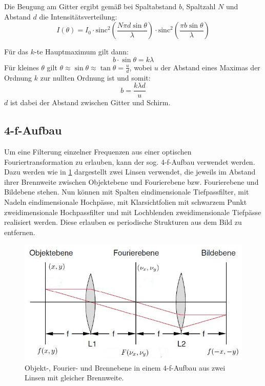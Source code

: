 \documentclass[
	a4paper,
	12pt,
	pagesize,
	ngerman
]{scrartcl}
\begin{document}
	Die Beugung am Gitter ergibt gemäß \cite{Anleitung} bei Spaltabstand $b$, Spaltzahl $N$ und Abstand $d$ die Intensitätsverteilung:
	\begin{equation}
		I(\theta) = I_0 \cdot \text{sinc}^2\left(\frac{N \pi d \sin \theta}{\lambda} \right) \cdot \text{sinc}^2\left(\frac{\pi b \sin \theta}{\lambda} \right)
	\end{equation}


	Für das $k$-te Hauptmaximum gilt dann:
	\begin{equation}
		b \cdot \sin{\theta} = k \lambda
	\end{equation}
	Für kleines $\theta$ gilt $\theta \approx \sin{\theta} \approx \tan{\theta}=\frac{u}{d}$, wobei $u$ der Abstand eines Maximas der Ordnung $k$ zur nullten Ordnung ist und somit:
	\begin{equation}
		\label{eq_beug}
		b = \frac{k\lambda d}{u}
	\end{equation}
	$d$ ist dabei der Abstand zwischen Gitter und Schirm.

	\subsection{4-f-Aufbau}
	Um eine Filterung einzelner Frequenzen aus einer optischen Fouriertransformation zu erlauben, kann der sog. 4-f-Aufbau verwendet werden.
	Dazu werden wie in \cref{fig_4f_schema} dargestellt zwei Linsen verwendet, die jeweils im Abstand ihrer Brennweite zwischen Objektebene und Fourierebene bzw. Fourierebene und Bildebene stehen.
	Nun können mit Spalten eindimensionale Tiefpassfilter, mit Nadeln eindimensionale Hochpässe, mit Klarsichtfolien mit schwarzem Punkt zweidimensionale Hochpassfilter und mit Lochblenden zweidimensionale Tiefpässe realisiert werden.
	Diese erlauben es periodische Strukturen aus dem Bild zu entfernen.

	\begin{figure}[H]
			\includegraphics[width=1\linewidth]{img/4f_schema}
			\caption{
				Objekt-, Fourier- und Brennebene in einem 4-f-Aufbau aus zwei Linsen mit gleicher Brennweite. \cite{Anleitung}
			}
			\label{fig_4f_schema}
	\end{figure}
\end{document}
